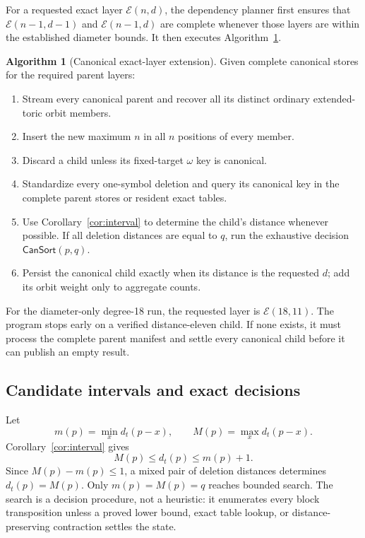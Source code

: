 \documentclass[11pt]{article}
\theoremstyle{definition}
\newtheorem{algorithm}[theorem]{Algorithm}
\theoremstyle{remark}
\newcommand{\dist}{d_t}
\newcommand{\E}{\mathcal E}
\newcommand{\CanSort}{\mathsf{CanSort}}
\begin{document}
For a requested exact layer $\E(n,d)$, the dependency planner first ensures
that $\E(n-1,d-1)$ and $\E(n-1,d)$ are complete whenever those layers are
within the established diameter bounds.  It then executes
Algorithm~\ref{alg:extension}.

\begin{algorithm}[Canonical exact-layer extension]
\label{alg:extension}
Given complete canonical stores for the required parent layers:
\begin{enumerate}[label=\arabic*.]
  \item Stream every canonical parent and recover all its distinct ordinary
    extended-toric orbit members.
  \item Insert the new maximum $n$ in all $n$ positions of every member.
  \item Discard a child unless its fixed-target $\omega$ key is canonical.
  \item Standardize every one-symbol deletion and query its canonical key in
    the complete parent stores or resident exact tables.
  \item Use Corollary~\ref{cor:interval} to determine the child's distance
    whenever possible.  If all deletion distances are equal to $q$, run the
    exhaustive decision $\CanSort(p,q)$.
  \item Persist the canonical child exactly when its distance is the requested
    $d$; add its orbit weight only to aggregate counts.
\end{enumerate}
\end{algorithm}

For the diameter-only degree-18 run, the requested layer is $\E(18,11)$.
The program stops early on a verified distance-eleven child.  If none exists,
it must process the complete parent manifest and settle every canonical child
before it can publish an empty result.

\subsection{Candidate intervals and exact decisions}

Let
\[
  m(p)=\min_x\dist(p-x),\qquad
  M(p)=\max_x\dist(p-x).
\]
Corollary~\ref{cor:interval} gives
\[
  M(p)\leq\dist(p)\leq m(p)+1.                  \tag{5.1}
\]
Since $M(p)-m(p)\leq1$, a mixed pair of deletion distances determines
$\dist(p)=M(p)$.  Only $m(p)=M(p)=q$ reaches bounded search.  The search is a
decision procedure, not a heuristic: it enumerates every block transposition
unless a proved lower bound, exact table lookup, or distance-preserving
contraction settles the state.
\end{document}
